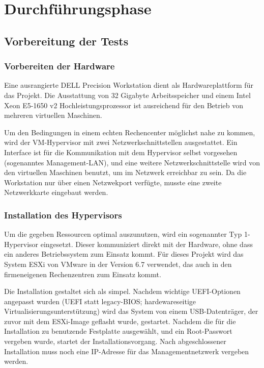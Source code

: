 \section{Durchführungsphase}
\label{sec:Durchführungsphase}

\subsection{Vorbereitung der Tests}
\label{sec:VorbereitungTests}

\subsubsection{Vorbereiten der Hardware}
\label{sec:VorbereitungHardware}
Eine ausrangierte DELL Precision Workstation dient als Hardwareplattform für das Projekt. Die Ausstattung von 32 Gigabyte Arbeitsspeicher und einem Intel Xeon E5-1650 v2 Hochleistungsprozessor ist ausreichend für den Betrieb von mehreren virtuellen Maschinen.

Um den Bedingungen in einem \glqq{}echten\grqq{} Rechencenter möglichst nahe zu kommen, wird der VM-Hypervisor mit zwei Netzwerkschnittstellen ausgestattet. Ein Interface ist für die Kommunikation mit dem Hypervisor selbst vorgesehen (sogenanntes Management-LAN), und eine weitere Netzwerkschnittstelle wird von den virtuellen Maschinen benutzt, um im Netzwerk erreichbar zu sein. Da die Workstation nur über einen Netzwekport verfügte, musste eine zweite Netzwerkkarte eingebaut werden.

\subsubsection{Installation des Hypervisors}
\label{sec:InstallationHypervisor}
Um die gegeben Ressourcen optimal auszunutzen, wird ein sogenannter Typ 1-Hypervisor eingesetzt. Dieser kommuniziert direkt mit der Hardware, ohne dass ein anderes Betriebssystem zum Einsatz kommt. Für dieses Projekt wird das System \glqq{}ESXi\grqq{} von VMware in der Version 6.7 verwendet, das auch in den firmeneigenen Rechenzentren zum Einsatz kommt.

Die Installation gestaltet sich als simpel. Nachdem wichtige UEFI-Optionen angepasst wurden (UEFI statt legacy-BIOS; hardewareseitige Virtualisierungsunterstützung) wird das System von einem USB-Datenträger, der zuvor mit dem ESXi-Image geflasht wurde, gestartet. Nachdem die für die Installation zu benutzende Festplatte ausgewählt, und ein Root-Passwort vergeben wurde, startet der Installationsvorgang. Nach abgeschlossener Installation muss noch eine IP-Adresse für das Managementnetzwerk vergeben werden.


